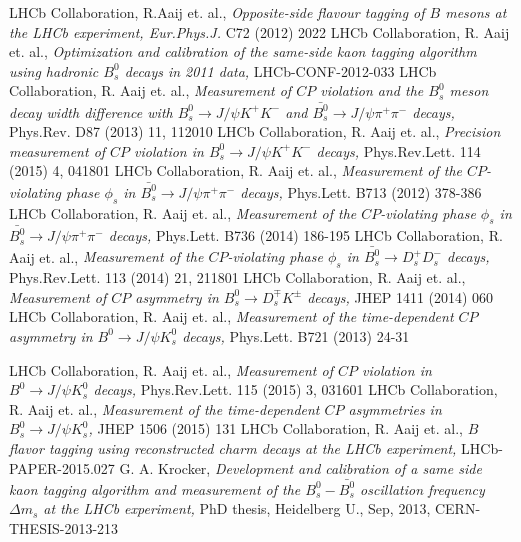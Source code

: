 \documentclass{PoS}
\begin{document}
\begin{thebibliography}{99}
LHCb Collaboration, R.Aaij et. al., {\it Opposite-side flavour tagging of $B$ mesons at the LHCb experiment, Eur.Phys.J.} C72 (2012) 2022
LHCb Collaboration, R. Aaij et. al., {\it Optimization and calibration of the same-side kaon \mbox{tagging} algorithm using hadronic $B_s^0$ decays in 2011 data,} LHCb-CONF-2012-033
LHCb Collaboration, R. Aaij et. al., {\it Measurement of $C\!P$ violation and the $B_s^0$ meson decay width difference with   $B_s^0\to J\!/\!\psi K^+K^-$ and \mbox{$\bar{B_s^0}\to J\!/\!\psi \pi^+\pi^-$} decays, } Phys.Rev. D87 (2013) 11, 112010
LHCb Collaboration, R. Aaij et. al., {\it Precision measurement of $C\!P$ violation in $B_s^0\to J\!/\!\psi K^+K^-$ decays, } Phys.Rev.Lett. 114 (2015) 4, 041801
 LHCb Collaboration, R. Aaij et. al., {\it Measurement of the $C\!P$-violating phase $\phi_s$ in $\bar{B_s^0}\to J\!/\!\psi \pi^+\pi^-$ decays, } Phys.Lett. B713 (2012) 378-386
 LHCb Collaboration, R. Aaij et. al., {\it Measurement of the $C\!P$-violating phase $\phi_s$ in $\bar{B_s^0}\to J\!/\!\psi \pi^+\pi^-$ decays, } Phys.Lett. B736 (2014) 186-195
 LHCb Collaboration, R. Aaij et. al., {\it Measurement of the $C\!P$-violating phase $\phi_s$ in $\bar{B_s^0}\to D_s^+D_s^-$ decays, } Phys.Rev.Lett. 113 (2014) 21, 211801
 LHCb Collaboration, R. Aaij et. al., {\it Measurement of $C\!P$ asymmetry in \mbox{$B_s^0\to D_s^\mp K^\pm$} decays, } JHEP 1411 (2014) 060
 LHCb Collaboration, R. Aaij et. al., {\it Measurement of the time-dependent $C\!P$ asymmetry in $B^0\to J\!/\!\psi K_s^0$ decays, } Phys.Lett. B721 (2013) 24-31

 LHCb Collaboration, R. Aaij et. al., {\it Measurement of $C\!P$ violation in \mbox{$B^0\to J\!/\!\psi K_s^0$} decays, } Phys.Rev.Lett. 115 (2015) 3, 031601
 LHCb Collaboration, R. Aaij et. al., {\it Measurement of the time-dependent $C\!P$ asymmetries in $B_s^0\to J\!/\!\psi K_s^0$, } JHEP 1506 (2015) 131
 LHCb Collaboration, R. Aaij et. al., {\it $B$ flavor tagging using reconstructed charm decays at the LHCb experiment, } LHCb-PAPER-2015.027
 G. A. Krocker, {\it Development and calibration of a same side kaon tagging algorithm and measurement of the $B_s^0-\bar{B_s^0}$ oscillation frequency $\Delta m_s$ at the LHCb experiment, } PhD thesis, Heidelberg U., Sep, 2013, CERN-THESIS-2013-213

\end{thebibliography} 
\end{document}

